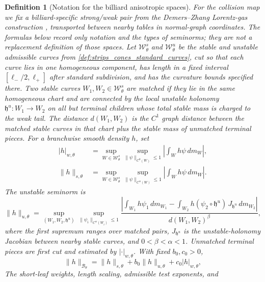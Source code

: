 \documentclass[11pt]{amsart}
\theoremstyle{compactplain}
\theoremstyle{compactdefinition}
\newtheorem{definition}[theorem]{Definition}
\theoremstyle{compactremark}
\newcommand{\Bcal}{\mathcal B}
\begin{document}
\begin{definition}[Notation for the billiard anisotropic spaces]
\label{def:anisotropic_spaces_resolvent}
For the collision map we fix a billiard-specific strong/weak pair from the
Demers--Zhang Lorentz-gas construction
\cite{DemersZhang2011,DemersZhang2013}, transported between nearby tables in
normal-graph coordinates.  The formulas below record only notation and the
types of seminorms; they are not a replacement definition of those spaces.
Let $\mathcal W_\theta^s$ and $\mathcal W_\theta^u$ be the stable and unstable
admissible curves from \cref{def:strips_cones_standard_curves}, cut so that
each curve lies in one homogeneous component, has length in a fixed interval
\([\ell_-/2,\ell_+]\) after standard subdivision, and has the curvature bounds
specified there.  Two stable curves \(W_1,W_2\in\mathcal W_\theta^s\) are
\emph{matched} if they lie in the same homogeneous chart and are connected by
the local unstable holonomy \(\mathfrak h^u:W_1\to W_2\) on all but terminal children whose
total stable mass is charged to the weak tail.  The distance \(d(W_1,W_2)\) is
the \(C^1\) graph distance between the matched stable curves in that chart plus
the stable mass of unmatched terminal pieces.  For a branchwise smooth density
\(h\), set
\begin{align}
  |h|_{w,\theta}
  &=\sup_{W\in\mathcal W_\theta^s}
    \sup_{\|\psi\|_{C^0(W)}\le1}
    \left|\int_W h\psi\,dm_W\right|,\\
  \|h\|_{s,\theta}
  &=\sup_{W\in\mathcal W_\theta^s}
    \sup_{\|\psi\|_{C^\alpha(W)}\le1}
    \left|\int_W h\psi\,dm_W\right|.
\end{align}
The unstable seminorm is
\begin{equation}
  \|h\|_{u,\theta}
  =
  \sup_{(W_1,W_2,\mathfrak h^u)}
  \sup_{\|\psi_i\|_{C^\alpha(W_i)}\le1}
  \frac{
  \left|
  \int_{W_1}h\psi_1\,dm_{W_1}
  -
  \int_{W_2}h(\psi_2\circ\mathfrak h^u)\,J_{\mathfrak h^u}\,dm_{W_2}
  \right|}
  {d(W_1,W_2)^\beta},
\end{equation}
where the first supremum ranges over matched pairs, \(J_{\mathfrak h^u}\) is the
unstable-holonomy Jacobian between nearby stable curves, and \(0<\beta<\alpha<1\).  Unmatched terminal pieces
are first cut and estimated by \(|\cdot|_{w,\theta}\).  With fixed
$b_0,c_0>0$,
\begin{equation}
  \|h\|_{\Bcal_\theta}
  =\|h\|_{s,\theta}+b_0\|h\|_{u,\theta}+c_0|h|_{w,\theta},
\end{equation}
The short-leaf weights, length scaling, admissible test exponents, and

\end{definition}
\end{document}
